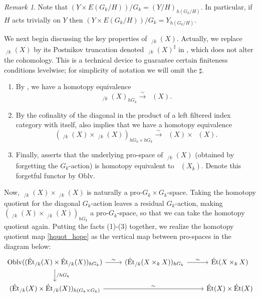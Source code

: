 \documentclass[10pt, reqno]{amsart}
\numberwithin{equation}{subsection}
\newcommand{\ol}[1]{\overline{#1}}
\newcommand{\mrm}[1]{\mathrm{#1}}
\DeclareMathOperator{\Et}{\acute{E}t}
\theoremstyle{remark}
\newtheorem{remark}[thm]{Remark}
\begin{document}
\begin{remark}\label{rem: htpy quotient cofinal}
Note that $(Y\times E(G_k/H))/G_k = (Y/H)_{h(G_k/H)}$. In particular, if $H$ acts trivially on $Y$ then $(Y\times E(G_k/H))/G_k =Y_{h(G_k/H)}$.
\end{remark}

We next begin discussing the key properties of $\Et_{/k}(X)$. Actually, we replace $\Et_{/k}(X)$ by its Postnikov truncation denoted $\Et_{/k}(X)^{\sharp}$ in \cite{HS}, which does not alter the cohomology. This is a technical device to guarantee certain finiteness conditions levelwise; for simplicity of notation we will omit the $\sharp$. 
\begin{enumerate}
\item By \cite[Proposition 9.82]{HS}, we have a homotopy equivalence
\[
\Et_{/k}(X)_{hG_k} \xrightarrow{\sim} \Et(X).
\]
\item By the cofinality of the diagonal in the product of a left filtered index category with itself, \cite[Proposition 9.82]{HS}  also implies that we have a homotopy equivalence
\[
(\Et_{/k}(X) \times \Et_{/k}(X))_{hG_k \times hG_k} \xrightarrow{\sim} \Et(X) \times \Et(X).
\]
\item Finally, \cite[Proposition 9.19]{HS} asserts that the underlying pro-space of $\Et_{/k}(X)$ (obtained by forgetting the $G_k$-action) is homotopy equivalent to $\Et(X_{\ol{k}})$. Denote this forgetful functor by $\mrm{Oblv}$.
\end{enumerate}

Now, $\Et_{/k}(X) \times \Et_{/k}(X)$ is naturally a pro-$G_k \times G_k$-space. Taking the homotopy quotient for the diagonal $G_k$-action leaves a residual $G_k$-action, making $(\Et_{/k}(X) \times \Et_{/k}(X))_{hG_k}$ a pro-$G_k$-space, so that we can take the homotopy quotient again. Putting the facts (1)-(3) together, we realize the homotopy quotient map \eqref{hquot_hope} as the vertical map between pro-spaces in the diagram below:
\begin{equation}\label{eq: homotopy quotient diagram}
\begin{tikzcd}
\mrm{Oblv} ((\Et_{/k}(X) \times \Et_{/k}(X))_{hG_k}) \ar[d, "/hG_k"]  \ar[r, "\sim" ] &  (\Et_{/k}(X \times_k X))_{hG_k}  \ar[r, "\sim"] & \Et(X \times_k X)  \\
 (\Et_{/k}(X) \times \Et_{/k}(X))_{h(G_k \times G_k)} \ar[rr, "\sim"]   & & \Et(X) \times \Et(X)
\end{tikzcd} 
\end{equation} 
\end{document}
